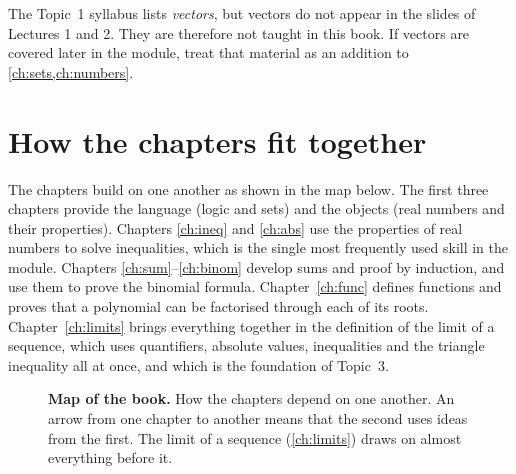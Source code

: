 \begin{sourcenote}[Coverage]
The Topic~1 syllabus lists \emph{vectors}, but vectors do not appear in the slides of Lectures 1 and 2.
They are therefore not taught in this book. If vectors are covered later in the module, treat that material
as an addition to \cref{ch:sets,ch:numbers}.
\end{sourcenote}

\section*{How the chapters fit together}
The chapters build on one another as shown in the map below. The first three chapters provide the
language (logic and sets) and the objects (real numbers and their properties). Chapters \ref{ch:ineq} and
\ref{ch:abs} use the properties of real numbers to solve inequalities, which is the single most frequently
used skill in the module. Chapters \ref{ch:sum}--\ref{ch:binom} develop sums and proof by induction, and
use them to prove the binomial formula. Chapter~\ref{ch:func} defines functions and proves that a polynomial
can be factorised through each of its roots. Chapter~\ref{ch:limits} brings everything together in the
definition of the limit of a sequence, which uses quantifiers, absolute values, inequalities and the
triangle inequality all at once, and which is the foundation of Topic~3.

\begin{figure}[ht]
\centering
{}
\caption*{\textbf{Map of the book.} How the chapters depend on one another. An arrow from one chapter to another means that the
second uses ideas from the first. The limit of a sequence (\cref{ch:limits}) draws on almost everything
before it.}
\end{figure}

